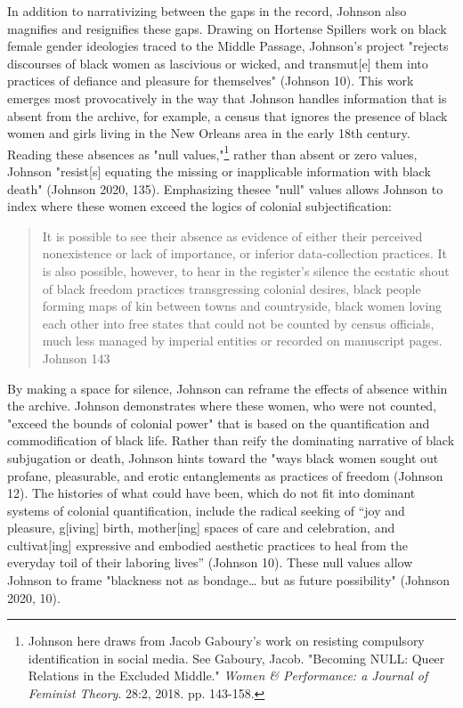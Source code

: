 \documentclass[11pt]{article}
\begin{document}
In addition to narrativizing between the gaps in the record, Johnson
also magnifies and resignifies these gaps. Drawing on Hortense
Spillers work on black female gender ideologies traced to the Middle
Passage, Johnson's project "rejects discourses of black women as
lascivious or wicked, and transmut[e] them into practices of defiance
and pleasure for themselves" (Johnson 10). This work emerges most
provocatively in the way that Johnson handles information that is
absent from the archive, for example, a census that ignores the
presence of black women and girls living in the New Orleans area in
the early 18th century. Reading these absences as "null values,"\footnote{Johnson here draws from Jacob Gaboury's work on resisting
compulsory identification in social media. See Gaboury,
Jacob. "Becoming NULL: Queer Relations in the Excluded Middle." \emph{Women
\& Performance: a Journal of Feminist Theory}. 28:2, 2018. pp. 143-158.}
rather than absent or zero values, Johnson "resist[s] equating the
missing or inapplicable information with black death" (Johnson 2020,
135). Emphasizing thesee "null" values allows Johnson to index where
these women exceed the logics of colonial subjectification:
\begin{quote}
It is possible to see their absence as evidence of either their
perceived nonexistence or lack of importance, or inferior
data-collection practices. It is also possible, however, to hear in
the register's silence the ecstatic shout of black freedom practices
transgressing colonial desires, black people forming maps of kin
between towns and countryside, black women loving each other into free
states that could not be counted by census officials, much less
managed by imperial entities or recorded on manuscript pages. Johnson
143
\end{quote}
By making a space for silence, Johnson can reframe the effects of
absence within the archive. Johnson demonstrates where these women,
who were not counted, "exceed the bounds of colonial power" that is
based on the quantification and commodification of black life. Rather
than reify the dominating narrative of black subjugation or death,
Johnson hints toward the "ways black women sought out profane,
pleasurable, and erotic entanglements as practices of freedom (Johnson
12). The histories of what could have been, which do not fit into
dominant systems of colonial quantification, include the radical
seeking of “joy and pleasure, g[iving] birth, mother[ing] spaces of
care and celebration, and cultivat[ing] expressive and embodied
aesthetic practices to heal from the everyday toil of their laboring
lives” (Johnson 10). These null values allow Johnson to frame
"blackness not as bondage\ldots{} but as future possibility" (Johnson 2020,
10).
\end{document}
